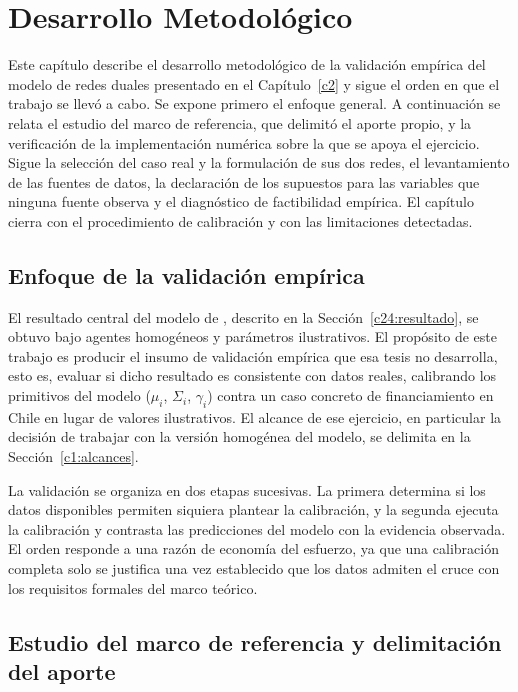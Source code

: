 
\chapter{Desarrollo Metodológico}
\label{c3}

Este capítulo describe el desarrollo metodológico de la validación empírica del
modelo de redes duales presentado en el Capítulo~\ref{c2} y sigue el orden en
que el trabajo se llevó a cabo. Se expone primero el enfoque general. A
continuación se relata el estudio del marco de referencia, que delimitó el
aporte propio, y la verificación de la implementación numérica sobre la que se
apoya el ejercicio. Sigue la selección del caso real y la formulación de sus dos
redes, el levantamiento de las fuentes de datos, la declaración de los supuestos
para las variables que ninguna fuente observa y el diagnóstico de factibilidad
empírica. El capítulo cierra con el procedimiento de calibración y con las
limitaciones detectadas.

\section{Enfoque de la validación empírica}
\label{c3:enfoque}

El resultado central del modelo de ,
descrito en la Sección~\ref{c24:resultado}, se obtuvo bajo agentes homogéneos y
parámetros ilustrativos. El propósito de este trabajo es producir el insumo de
validación empírica que esa tesis no desarrolla, esto es, evaluar si dicho
resultado es consistente con datos reales, calibrando los primitivos del modelo
($\mu_i$, $\Sigma_i$, $\gamma_i$) contra un caso concreto de financiamiento en
Chile en lugar de valores ilustrativos. El alcance de ese ejercicio, en
particular la decisión de trabajar con la versión homogénea del modelo, se
delimita en la Sección~\ref{c1:alcances}.

La validación se organiza en dos etapas sucesivas. La primera determina si los
datos disponibles permiten siquiera plantear la calibración, y la segunda
ejecuta la calibración y contrasta las predicciones del modelo con la evidencia
observada. El orden responde a una razón de economía del esfuerzo, ya que una
calibración completa solo se justifica una vez establecido que los datos admiten
el cruce con los requisitos formales del marco teórico.

\section{Estudio del marco de referencia y delimitación del aporte}
\label{c3:literatura}

